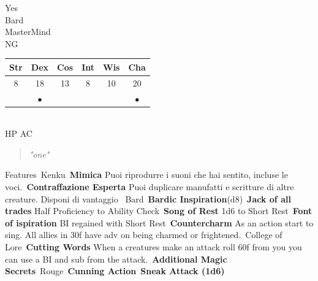 \documentclass[11pt]{article}
\newcommand*\circled[1]{\tikz[baseline=(char.base)]{
\node[shape=circle,draw,inner sep=2pt] (char) {#1};}}
\begin{document}
\begin{minipage}{0.5\textwidth}%
\Huge{\Fontauri Yes } \\
\Large{Bard} \\
\textcolor{OCRA}{MasterMind} \\
NG
\vspace{1cm}
\begin{tabular}{cccccc}
Str & Dex & Cos & Int & Wis & Cha \\ \hline 
8 & 18 & 13 & 8 & 10 & 20\\ 
 & $\bullet$ & & & & $\bullet$
\end{tabular}
\vspace{1cm} \\
\textcolor{OCRA}{HP} \circled{58} \hspace{3cm} \textcolor{OCRA}{AC} \circled{15}
\end{minipage}
\vspace{0.5cm}
\begin{quote}
\textit{\Fontauri "one"}
\end{quote}
\begin{minipage}[t]{.5\textwidth}
{\huge \Fontauri Features}\
\textcolor{OCRA}{Kenku}\
\textbf{Mimica} Puoi riprodurre i suoni che hai sentito, incluse le voci.\
\textbf{Contraffazione Esperta} Puoi duplicare manufatti e scritture di altre creature. Disponi di vantaggio \
\textcolor{OCRA}{Bard}\
\textbf{Bardic Inspiration}(d8)\
\textbf{Jack of all trades} Half Proficiency to Ability Check\
\textbf{Song of Rest} 1d6 to Short Rest\
\textbf{Font of ispiration} BI regained with Short Rest\
\textbf{Countercharm} As an action start to sing. All allies in 30f have adv on being charmed or frightened.\
\textcolor{OCRA}{College of Lore}\
\textbf{Cutting Words} When a creatures make an attack roll 60f from you you can use a BI and sub from the attack.\
\textbf{Additional Magic Secrets}\
\textcolor{OCRA}{Rouge}\
\textbf{Cunning Action}\
\textbf{Sneak Attack (1d6)}\
\end{minipage}
\end{document}
